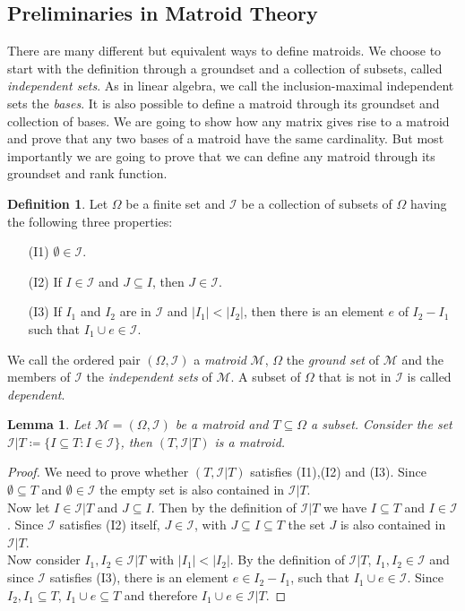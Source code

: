 \documentclass[12pt,a4paper, twoside, autooneside=false]{scrartcl}
\newtheorem{lemma}[theorem]{Lemma}
\theoremstyle{definition}
\newtheorem{definition}[theorem]{Definition}
\theoremstyle{remark}
\numberwithin{equation}{section}
\newcommand{\M}{\mathcal{M}} %
\begin{document}
\subsection{Preliminaries in Matroid Theory}
There are many different but equivalent ways to define matroids. We choose to start with the definition through a groundset and a collection of subsets, called \textit{independent sets}. As in linear algebra, we call the inclusion-maximal independent sets the \textit{bases}. It is also possible to define a matroid through its groundset and collection of bases. We are going to show how any matrix gives rise to a matroid and prove that any two bases of a matroid have the same cardinality. But most importantly we are going to prove that we can define any matroid through its groundset and rank function. 
\begin{definition}
Let $\Omega$ be a finite set and $\mathcal{I}$ be a collection of subsets of $\Omega$ having the following three properties:
\begin{itemize}
\item[(I1)] $\emptyset \in \mathcal{I}$.
\item[(I2)] If $I \in \mathcal{I}$ and $J \subseteq I$, then $J \in \mathcal{I}$.
\item[(I3)] If $I_1$ and $I_2$ are in $\mathcal{I}$ and $|I_1| < |I_2|$, then there is an element $e$ of $I_2 - I_1$ such that $I_1 \cup e \in \mathcal{I}$.
\end{itemize}
We call the ordered pair $(\Omega, \mathcal{I})$ a \textit{matroid} $\M$, $\Omega$ the \textit{ground set} of $\M$ and the members of $\mathcal{I}$ the \textit{independent sets} of $\M$. A subset of $\Omega$ that is not in $\mathcal{I}$ is called \textit{dependent}.
\end{definition}
\begin{lemma}
Let $\M = (\Omega, \mathcal{I})$ be a matroid and $T \subseteq \Omega$ a subset. Consider the set $\mathcal{I}|T \coloneqq \{I \subseteq T: I \in \mathcal{I}\}$, then $(T, \mathcal{I}|T)$ is a matroid. 
\end{lemma}
\begin{proof}
We need to prove whether $(T, \mathcal{I}|T)$ satisfies (I1),(I2) and (I3). Since $\emptyset \subseteq T$ and $\emptyset \in \mathcal{I}$ the empty set is also contained in $\mathcal{I}|T$. \\
\indent Now let $I \in \mathcal{I}|T$ and $J \subseteq I$. Then by the definition of $\mathcal{I}|T$ we have $I \subseteq T$ and $I \in \mathcal{I}$. Since $\mathcal{I}$ satisfies (I2) itself, $J \in \mathcal{I}$, with $J \subseteq I \subseteq T$ the set $J$ is also contained in $\mathcal{I}|T$. \\ \indent
Now consider $I_1, I_2 \in \mathcal{I}|T$ with $|I_1| < |I_2|$. By the definition of $\mathcal{I}|T$, $I_1,I_2 \in \mathcal{I}$ and since $\mathcal{I}$ satisfies (I3), there is an element $e \in I_2 - I_1$, such that $I_1 \cup e \in \mathcal{I}$. Since $I_2, I_1 \subseteq T$, $I_1 \cup e \subseteq T$ and therefore $I_1 \cup e \in \mathcal{
I}|T$.
\end{proof}
\end{document}
